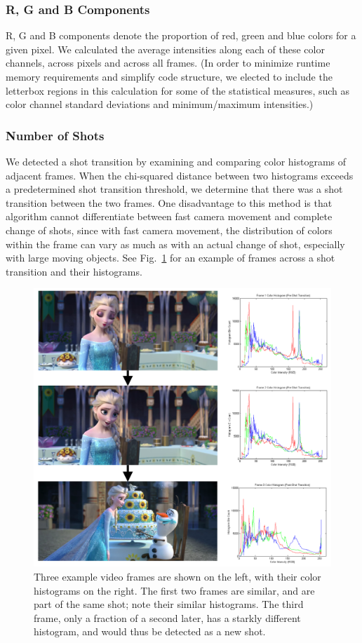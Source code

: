 \documentclass[letterpaper, 10 pt, conference]{ieeeconf}  %
\begin{document}
\subsubsection{R, G and B Components}

R, G and B components denote the proportion of red, green and blue colors for a given pixel. We calculated the average intensities along each of these color channels, across pixels and across all frames. (In order to minimize runtime memory requirements and simplify code structure, we elected to include the letterbox regions in this calculation for some of the statistical measures, such as color channel standard deviations and minimum/maximum intensities.)

\subsubsection{Number of Shots}
We detected a shot transition by examining and comparing color histograms of adjacent frames. When the chi-squared distance between two histograms exceeds a predetermined shot transition threshold, we determine that there was a shot transition between the two frames. One disadvantage to this method is that algorithm cannot differentiate between fast camera movement and complete change of shots, since with fast camera movement, the distribution of colors within the frame can vary as much as with an actual change of shot, especially with large moving objects. See Fig.~\ref{f:histograms_combined} for an example of frames across a shot transition and their histograms.

\begin{figure}[h]
	\centering
	\includegraphics[width=\columnwidth]{histograms_combined.png}
	\caption{Three example video frames are shown on the left, with their color histograms on the right. The first two frames are similar, and are part of the same shot; note their similar histograms. The third frame, only a fraction of a second later, has a starkly different histogram, and would thus be detected as a new shot.}
	\label{f:histograms_combined}
\end{figure}
\end{document}
